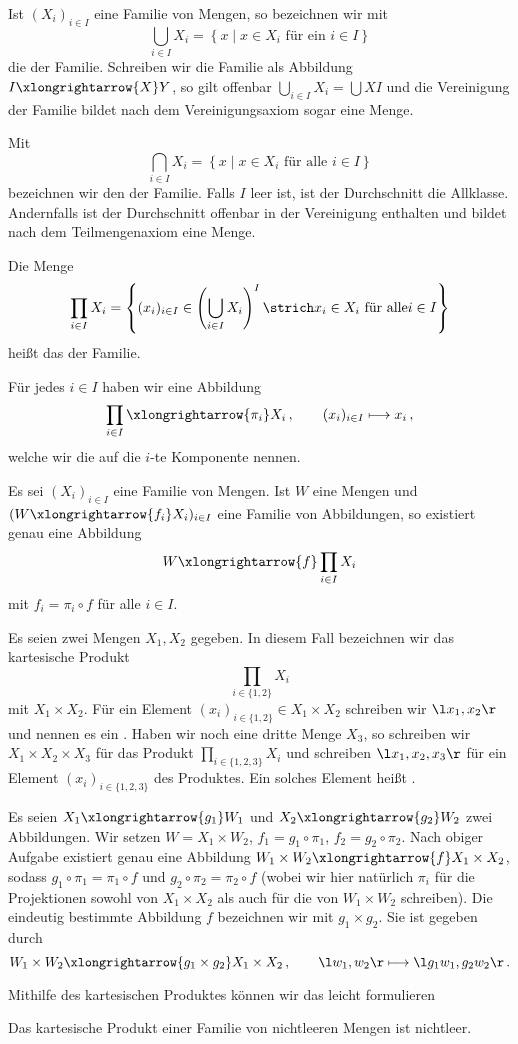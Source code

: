Ist $(X_i)_{i\in I}$ eine Familie von Mengen, so bezeichnen wir mit
\[
\bigcup_{i\in I}X_i=\left\{x\mid x\in X_i\text{ für ein }i\in I\right\}
\]
die  der Familie. Schreiben wir die Familie als Abbildung $I\xlongrightarrow{X}Y$, so gilt offenbar $\bigcup_{i\in I}X_i=\bigcup XI$ und die Vereinigung der Familie bildet nach dem Vereinigungsaxiom sogar eine Menge.

Mit
\[
\bigcap_{i\in I}X_i=\left\{x\mid x\in X_i\text{ für alle } i\in I\right\}
\]
bezeichnen wir den  der Familie. Falls $I$ leer ist, ist der Durchschnitt die Allklasse. Andernfalls ist der Durchschnitt offenbar in der Vereinigung enthalten und bildet nach dem Teilmengenaxiom eine Menge.

Die Menge
\[
\prod_{i\in I}X_i=\left\{(x_i)_{i\in I}\in\left(\bigcup_{i\in I}X_i\right)^I\strich x_i\in X_i\text{ für alle} i\in I\right\}
\]
heißt das  der Familie.

Für jedes $i\in I$ haben wir eine Abbildung
\[
\prod_{i\in I}\xlongrightarrow{\pi_i}X_i\,,\qquad(x_i)_{i\in I}\longmapsto x_i\,,
\]
welche wir die  auf die $i$-te Komponente nennen.
\begin{task}
Es sei $(X_i)_{i\in I}$ eine Familie von Mengen. Ist $W$ eine Mengen und $(W\xlongrightarrow{f_i}X_i)_{i\in I}$ eine Familie von Abbildungen, so existiert genau eine Abbildung
\[W\xlongrightarrow{f}\prod_{i\in I}X_i\]
mit $f_i=\pi_i\circ f$ für alle $i\in I$.
\end{task}

Es seien zwei Mengen $X_1,X_2$ gegeben. In diesem Fall bezeichnen wir das kartesische Produkt
\[
\prod_{i\in \{1,2\}}X_i
\]
mit $X_1\times X_2$. Für ein Element $(x_i)_{i\in\{1,2\}}\in X_1\times X_2$ schreiben wir $\l x_1,x_2\r$ und nennen es ein . Haben wir noch eine dritte Menge $X_3$, so schreiben wir $X_1\times X_2\times X_3$ für das Produkt $\prod_{i\in\{1,2,3\}}X_i$ und schreiben $\l x_1,x_2,x_3\r$ für ein Element $(x_i)_{i\in\{1,2,3\}}$ des Produktes. Ein solches Element heißt .

\begin{example}
Es seien $X_1\xlongrightarrow{g_1}W_1$ und $X_2\xlongrightarrow{g_2}W_2$ zwei Abbildungen. Wir setzen $W=X_1\times W_2$, $f_1=g_1\circ\pi_1$, $f_2=g_2\circ\pi_2$. Nach obiger Aufgabe existiert genau eine Abbildung $W_1\times W_2\xlongrightarrow{f}X_1\times X_2$, sodass $g_1\circ\pi_1=\pi_1\circ f$ und $g_2\circ\pi_2=\pi_2\circ f$ (wobei wir hier natürlich $\pi_i$ für die Projektionen sowohl von $X_1\times X_2$ als auch für die von $W_1\times W_2$ schreiben). Die eindeutig bestimmte Abbildung $f$ bezeichnen wir mit $g_1\times g_2$. Sie ist gegeben durch
\[
W_1\times W_2\xlongrightarrow{g_1\times g_2}X_1\times X_2\,,\qquad \l w_1,w_2\r\longmapsto\l g_1w_1,g_2w_2\r\,.
\]
\end{example}
Mithilfe des kartesischen Produktes können wir das  leicht formulieren
\begin{axiom}
Das kartesische Produkt einer Familie von nichtleeren Mengen ist nichtleer.
\end{axiom}

